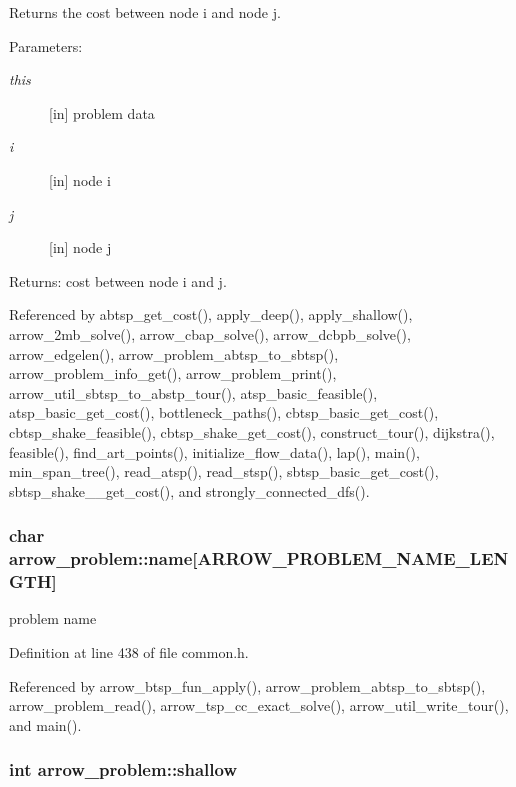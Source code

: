 Returns the cost between node i and node j. 

\begin{Desc}
\item[Parameters:]
\begin{description}
\item[{\em this}]\mbox{[}in\mbox{]} problem data \item[{\em i}]\mbox{[}in\mbox{]} node i \item[{\em j}]\mbox{[}in\mbox{]} node j \end{description}
\end{Desc}
\begin{Desc}
\item[Returns:]cost between node i and j. \end{Desc}


Referenced by abtsp\_\-get\_\-cost(), apply\_\-deep(), apply\_\-shallow(), arrow\_\-2mb\_\-solve(), arrow\_\-cbap\_\-solve(), arrow\_\-dcbpb\_\-solve(), arrow\_\-edgelen(), arrow\_\-problem\_\-abtsp\_\-to\_\-sbtsp(), arrow\_\-problem\_\-info\_\-get(), arrow\_\-problem\_\-print(), arrow\_\-util\_\-sbtsp\_\-to\_\-abstp\_\-tour(), atsp\_\-basic\_\-feasible(), atsp\_\-basic\_\-get\_\-cost(), bottleneck\_\-paths(), cbtsp\_\-basic\_\-get\_\-cost(), cbtsp\_\-shake\_\-feasible(), cbtsp\_\-shake\_\-get\_\-cost(), construct\_\-tour(), dijkstra(), feasible(), find\_\-art\_\-points(), initialize\_\-flow\_\-data(), lap(), main(), min\_\-span\_\-tree(), read\_\-atsp(), read\_\-stsp(), sbtsp\_\-basic\_\-get\_\-cost(), sbtsp\_\-shake\_\_\-get\_\-cost(), and strongly\_\-connected\_\-dfs().\hypertarget{structarrow__problem_8b7fec7ddd0462d3d841b87e287cff9f}{
\subsubsection[{name}]{\setlength{\rightskip}{0pt plus 5cm}char {\bf arrow\_\-problem::name}\mbox{[}ARROW\_\-PROBLEM\_\-NAME\_\-LENGTH\mbox{]}}}
\label{structarrow__problem_8b7fec7ddd0462d3d841b87e287cff9f}


problem name 

Definition at line 438 of file common.h.

Referenced by arrow\_\-btsp\_\-fun\_\-apply(), arrow\_\-problem\_\-abtsp\_\-to\_\-sbtsp(), arrow\_\-problem\_\-read(), arrow\_\-tsp\_\-cc\_\-exact\_\-solve(), arrow\_\-util\_\-write\_\-tour(), and main().\hypertarget{structarrow__problem_8c3f4f7794c1430440658d69151b296d}{
\subsubsection[{shallow}]{\setlength{\rightskip}{0pt plus 5cm}int {\bf arrow\_\-problem::shallow}}}
\label{structarrow__problem_8c3f4f7794c1430440658d69151b296d}


